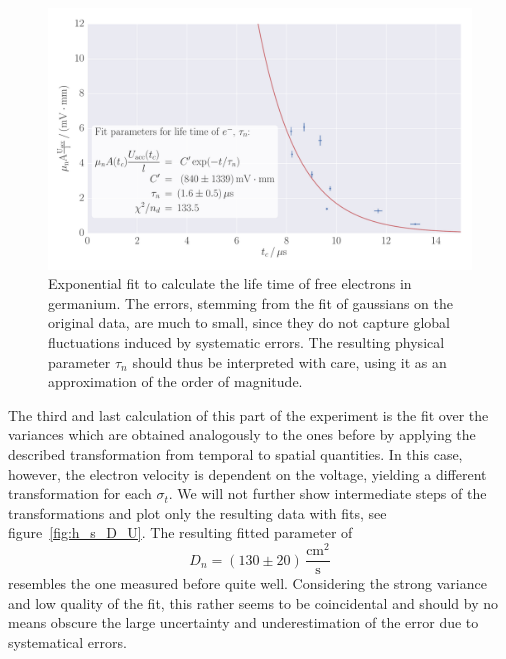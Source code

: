 \begin{figure}
    \includegraphics[width=1.0\textwidth]{figures/haynes_shockley_tau_U}
    \caption{
        Exponential fit to calculate the life time of free electrons in germanium. 
        The errors, stemming from the fit of gaussians on the original data, 
        are much to small, since they do not capture global fluctuations induced 
        by systematic errors. The resulting physical parameter $\tau_n$ should 
        thus be interpreted with care, using it as an approximation of the 
        order of magnitude. 
        }
    \label{fig:h_s_tau_U}
\end{figure}
The third and last calculation of this part of the experiment is the fit over the 
variances which are obtained analogously to the ones before by applying the 
described transformation from temporal to spatial quantities. 
In this case, however, the electron velocity is dependent on 
the voltage, yielding a different transformation for each $\sigma_t$. 
We will not further show intermediate steps of the transformations and 
plot only the resulting data with fits, see figure~\ref{fig:h_s_D_U}. 
The resulting fitted parameter of 
\begin{equation}
    D_n = (130 \pm 20)\, \mathrm{\frac{cm^2}{s}} 
\end{equation}
resembles the one measured before quite well. Considering the 
strong variance and low quality of the fit, this rather seems to 
be coincidental and should by no means obscure the large uncertainty 
and underestimation of the error due to systematical errors. 
